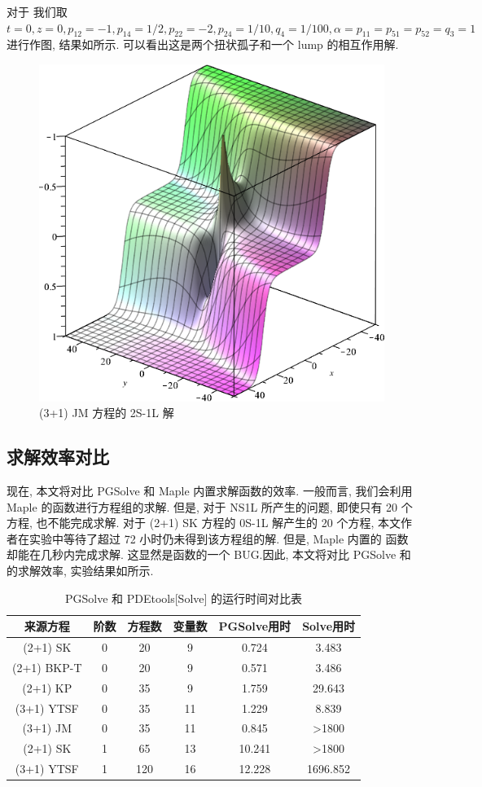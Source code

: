 对于 我们取 $t=0,z=0,p_{12}=-1,p_{14}=1/2,p_{22}=-2,p_{24}=1/10,q_4=1/100,\alpha=p_{11}=p_{51}=p_{52}=q_3=1$进行作图, 结果如所示. 可以看出这是两个扭状孤子和一个 lump 的相互作用解.

\begin{figure}[H]
\centering
\includegraphics[width=.6\textwidth]{fig/2S1L.png}
\caption{(3+1) JM 方程的 2S-1L 解} \label{fig-2S1L}
\end{figure}

\subsection{求解效率对比}

现在, 本文将对比 PGSolve 和 Maple 内置求解函数的效率. 一般而言, 我们会利用 Maple 的函数进行方程组的求解. 但是, 对于 NS1L 所产生的问题, 即使只有 20 个方程, 也不能完成求解. 对于 (2+1) SK 方程的 0S-1L 解产生的 20 个方程, 本文作者在实验中等待了超过 72 小时仍未得到该方程组的解. 但是, Maple 内置的  函数却能在几秒内完成求解. 这显然是函数的一个 BUG.因此, 本文将对比 PGSolve 和  的求解效率, 实验结果如所示. 

\begin{table}[htbp]
\centering
\caption{PGSolve 和 PDEtools[Solve] 的运行时间对比表} \label{NS1L-cmp}
\begin{tabular}{cccccc}
\hline
来源方程 & 阶数 & 方程数 & 变量数 & PGSolve用时 & Solve用时 \\
\hline
(2+1) SK & 0 & 20 & 9 & 0.724 & 3.483 \\
(2+1) BKP-T & 0 & 20 & 9 & 0.571 & 3.486 \\
(2+1) KP & 0 & 35 & 9 & 1.759 & 29.643 \\
(3+1) YTSF & 0 & 35 & 11 & 1.229 & 8.839 \\
(3+1) JM & 0 & 35 & 11 & 0.845 & >1800 \\
(2+1) SK & 1 & 65 & 13 & 10.241 & >1800 \\
(3+1) YTSF & 1 & 120 & 16 & 12.228 & 1696.852 \\
\hline
\end{tabular}
\end{table}

